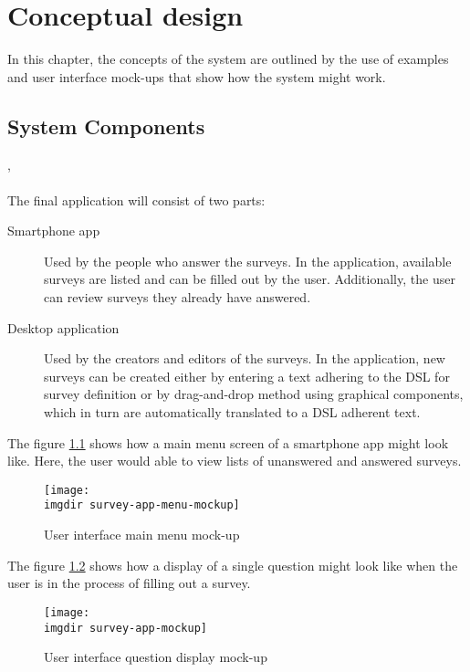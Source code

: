\chapter{Conceptual design}
\label{chap:examples}
In this chapter, the concepts of the system are outlined by the use of examples and user interface mock-ups that show how the system might work.

\section{System Components}
\label{sec:systemcomponents}
\kim , \anna \\\\
The final application will consist of two parts: 

\begin{description}
\item[Smartphone app] Used by the people who answer the surveys. In the application, available surveys are listed and can be filled out by the user. Additionally, the user can review surveys they already have answered.
\item[Desktop application] Used by the creators and editors of the surveys. In the application, new surveys can be created either by entering a text adhering to the DSL for survey definition or by drag-and-drop method using graphical components, which in turn are automatically translated to a DSL adherent text.
\end{description}

The figure \ref{fig:survey-app-menu-mockup} shows how a main menu screen of a smartphone app might look like. Here, the user would able to view lists of unanswered and answered surveys.

\begin{figure}[!ht]
  \centering
  \texttt{[image: \\imgdir survey-app-menu-mockup]}
  \caption{User interface main menu mock-up}
  \label{fig:survey-app-menu-mockup}
\end{figure}

The figure \ref{fig:survey-app-mockup} shows how a display of a single question might look like when the user is in the process of filling out a survey.

\begin{figure}[!ht]
  \centering
  \texttt{[image: \\imgdir survey-app-mockup]}
  \caption{User interface question display mock-up}
  \label{fig:survey-app-mockup}
\end{figure}

